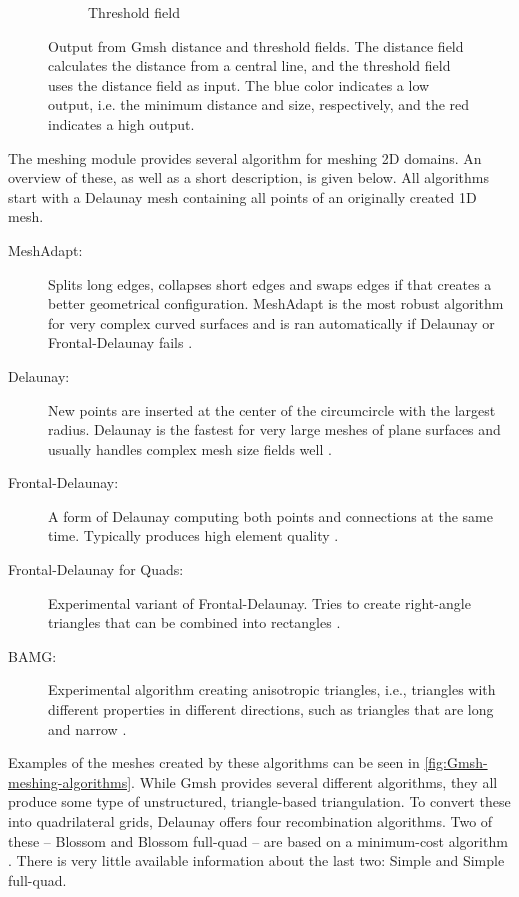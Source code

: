 \begin{figure}
\begin{subfigure}[b]{0.45\textwidth}
        \caption{Threshold field}
        \label{fig:gmsh-threshold}
    \end{subfigure}
    \caption[Output from Gmsh distance and threshold fields.]{Output from Gmsh distance and threshold fields. The distance field calculates the distance from a central line, and the threshold field uses the distance field as input. The blue color indicates a low output, i.e. the minimum distance and size, respectively, and the red indicates a high output.}
    \label{fig:gmsh-fields}
\end{figure}


The meshing module provides several algorithm for meshing 2D domains. An overview of these, as well as a short description, is given below. All algorithms start with a Delaunay mesh containing all points of an originally created 1D mesh.
\begin{description}
    \item[MeshAdapt:] Splits long edges, collapses short edges and swaps edges if that creates a better geometrical configuration. MeshAdapt is the most robust algorithm for very complex curved surfaces and is ran automatically if Delaunay or Frontal-Delaunay fails \cite{Gmsh_reference}.
    \item[Delaunay:] New points are inserted at the center of the circumcircle with the largest radius. Delaunay is the fastest for very large meshes of plane surfaces and usually handles complex mesh size fields well \cite{Gmsh_reference}.
    \item[Frontal-Delaunay:] A form of Delaunay computing both points and connections at the same time. Typically produces high element quality \cite{Gmsh_reference}.
    \item[Frontal-Delaunay for Quads:] Experimental variant of Frontal-Delaunay. Tries to create right-angle triangles that can be combined into rectangles \cite{Gmsh_reference}.
    \item[BAMG:] Experimental algorithm creating anisotropic triangles, i.e., triangles with different properties in different directions, such as triangles that are long and narrow \cite{Gmsh_reference}.
\end{description}

Examples of the meshes created by these algorithms can be seen in \autoref{fig:Gmsh-meshing-algorithms}. While Gmsh provides several different algorithms, they all produce some type of unstructured, triangle-based triangulation. To convert these into quadrilateral grids, Delaunay offers four recombination algorithms. Two of these -- Blossom and Blossom full-quad -- are based on a minimum-cost algorithm \cite{Gmsh_article}. There is very little available information about the last two: Simple and Simple full-quad.

